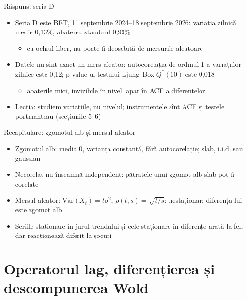 \begin{frame}{Răspuns: seria D}
\itemsize{\small}
\begin{itemize}
    \item Seria D este BET, 11 septembrie 2024--18 septembrie 2026: variația zilnică medie 0{,}13\%, abaterea standard 0{,}99\%
    \begin{itemize}
        \item cu ochiul liber, nu poate fi deosebită de mersurile aleatoare
    \end{itemize}
    \item Datele nu sînt exact un mers aleator: autocorelația de ordinul 1 a variațiilor zilnice este 0{,}12; p-value-ul testului Ljung--Box $Q^*(10)$ este 0{,}018
    \begin{itemize}
        \item abaterile mici, invizibile în nivel, apar în ACF a diferențelor
    \end{itemize}
    \item Lecția: studiem variațiile, nu nivelul; instrumentele sînt ACF și testele portmanteau (secțiunile 5--6)
\end{itemize}
\end{frame}

\begin{frame}{Recapitulare: zgomotul alb și mersul aleator}
\itemsize{\small}
\begin{itemize}
    \item Zgomotul alb: media 0, varianța constantă, fără autocorelație; slab, i.i.d. sau gaussian
    \item Necorelat nu înseamnă independent: pătratele unui zgomot alb slab pot fi corelate
    \item Mersul aleator: $\mathrm{Var}(X_t) = t\sigma^2$, $\rho(t, s) = \sqrt{t/s}$: nestaționar; diferența lui este zgomot alb
    \item Seriile staționare în jurul trendului și cele staționare în diferențe arată la fel, dar reacționează diferit la șocuri
\end{itemize}
\end{frame}


\section{Operatorul lag, diferențierea și descompunerea Wold}

